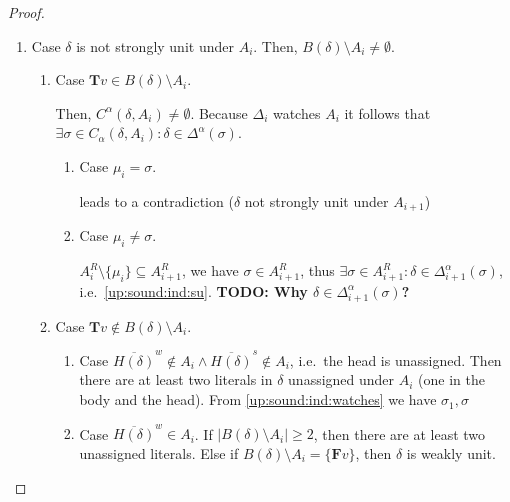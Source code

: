 \documentclass{vutinfth} %
\newcommand{\todo}[1]{{\color{red}\textbf{TODO: {#1}}}} %
\newcommand{\negstrong}[1]{\overline{#1}^s}
\newcommand{\negweak}[1]{\overline{#1}^w}
\newcommand{\ass}{A}
\newcommand{\bT}{\mathbf{T}}
\newcommand{\bF}{\mathbf{F}}
\newcommand{\dal}{\Delta^\alpha}
\newcommand{\headf}{H}
\newcommand{\bodyf}{B}
\newcommand{\sgl}{\mu}
\newcommand{\bsgl}{\sigma}
\begin{document}
\begin{proof}
\begin{enumerate}
\begin{enumerate}
	
	\item Case $\delta$ is not strongly unit under $A_i$. Then, $\bodyf(\delta) \setminus A_i \not = \emptyset$.


	\begin{enumerate}
		\item Case ${\bT v} \in \bodyf(\delta) \setminus A_i$.
		
		Then, $C^\alpha(\delta, A_{i}) \not = \emptyset$. Because $\Delta_i$ watches $\ass_i$ it follows that $\exists \bsgl \in C_\alpha(\delta, A_i): \delta \in \dal(\sigma)$.
		
		\begin{enumerate}
			\item Case $\sgl_i = \bsgl$.
			
			leads to a contradiction ($\delta$ not strongly unit under $A_{i+1}$)
			
			\item Case $\sgl_i \not = \bsgl$.
			
			$\ass_{i}^R \setminus \{ \sgl_i \} \subseteq \ass_{i+1}^R$, we have $\bsgl \in \ass_{i+1}^R$, thus $\exists \bsgl \in \ass_{i+1}^R : \delta \in \dal_{i+1}(\bsgl)$, i.e.~\ref{up:sound:ind:su}. \todo{Why $\delta \in \dal_{i+1}(\bsgl)$?}
		\end{enumerate}			
			
		\item Case ${\bT v} \not \in \bodyf(\delta) \setminus A_i$.
			\begin{enumerate}
				\item Case $\negweak{\headf(\delta)} \not \in A_{i} \wedge \negstrong{\headf(\delta)} \not \in A_{i}$, i.e.~the head is unassigned. Then there are at least two literals in $\delta$ unassigned under $A_i$ (one in the body and the head). From \ref{up:sound:ind:watches} we have $\bsgl_1, \bsgl $
				\item Case $\negweak{\headf(\delta)} \in A_{i}$.
				If $|\bodyf(\delta) \setminus A_i| \geq 2$, then there are at least two unassigned literals. Else if $\bodyf(\delta) \setminus A_i = \{ {\bF v} \}$, then $\delta$ is weakly unit.
			\end{enumerate}
	\end{enumerate}



\end{enumerate}
\end{enumerate}
\end{proof}
\end{document}
